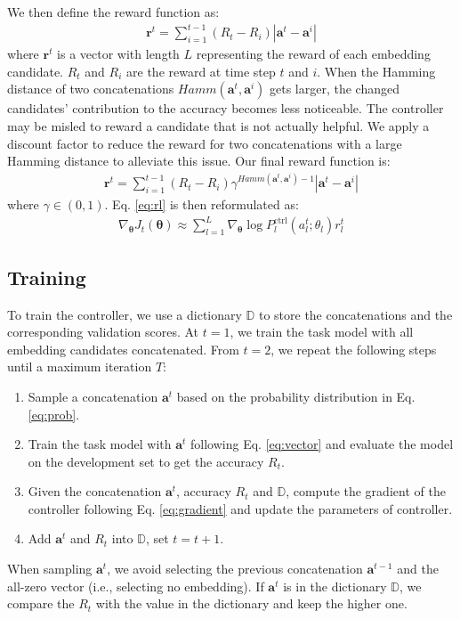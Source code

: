 \documentclass[11pt,a4paper]{article}
\def\vtheta{{\bm{\theta}}}
\def\va{{\bm{a}}}
\def\vr{{\bm{r}}}
\def\eva{{a}}
\def\evr{{r}}
\def\sD{{\mathbb{D}}}
\begin{document}
We then define the reward function as:
\begin{align}
\vr^t = \sum_{i=1}^{t-1} (R_t-R_i) |\va^t-\va^{i}| \label{eq:reward_a}
\end{align}
where $\vr^t$ is a vector with length $L$ representing the reward of each embedding candidate. $R_t$ and $R_i$ are the reward at time step $t$ and $i$. 
When the Hamming distance of two concatenations $Hamm(\va^t,\va^{i})$ gets larger, the changed candidates' contribution to the accuracy becomes less noticeable. The controller may be misled to reward a candidate that is not actually helpful.
We apply a discount factor to reduce the reward for two concatenations with a large Hamming distance to alleviate this issue.
Our final reward function is:
\begin{align}
\vr^t {=} \sum_{i=1}^{t-1} (R_t{-}R_i) \gamma ^{Hamm(\va^t,\va^{i})-1} |\va^t{-}\va^{i}| \label{eq:reward}
\end{align}
where $\gamma \in (0,1)$. Eq. \ref{eq:rl} is then reformulated as:
\begin{align}
\nabla_\vtheta J_t(\vtheta) \approx \sum_{l=1}^L \nabla_\vtheta \log P_l^{\text{ctrl}}(\eva_l^t;\theta_l) \evr^t_{l} \label{eq:gradient}
\end{align} 

\subsection{Training}
To train the controller, we use a dictionary $\sD$ to store the concatenations and the corresponding validation scores. At $t=1$, we train the task model with all embedding candidates concatenated. From $t=2$, we repeat the following steps until a maximum iteration $T$:
\begin{enumerate}[leftmargin=*]
    \item Sample a concatenation $\va^t$ based on the probability distribution in Eq. \ref{eq:prob}.
    \item Train the task model with $\va^t$ following Eq. \ref{eq:vector} and evaluate the model on the development set to get the accuracy $R_t$.
    \item Given the concatenation $\va^t$, accuracy $R_t$ and $\sD$, compute the gradient of the controller following Eq. \ref{eq:gradient} and update the parameters of controller.
    \item Add $\va^t$ and $R_t$ into $\sD$, set $t=t+1$.
\end{enumerate}
When sampling $\va^t$, we avoid selecting the previous concatenation $\va^{t-1}$ and the all-zero vector (i.e., selecting no embedding). If $\va^t$ is in the dictionary $\sD$, we compare the $R_t$ with the value in the dictionary and keep the higher one.
\end{document}
